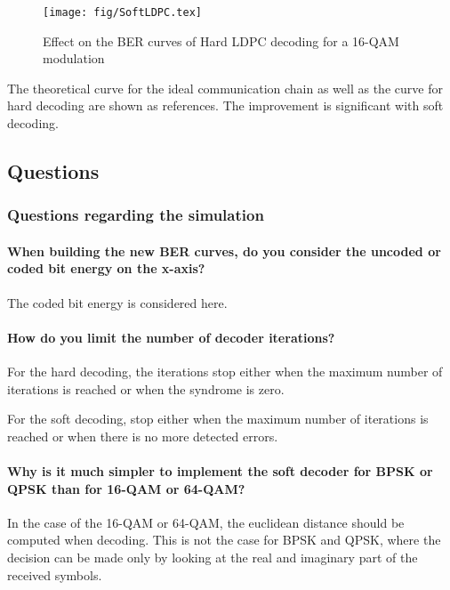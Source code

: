 \begin{figure}[H]
\centering
    \texttt{[image: fig/SoftLDPC.tex]}
     \caption{Effect on the BER curves of Hard LDPC decoding for a 16-QAM modulation}
    \label{fig:SoftLDPC}
\end{figure}

The theoretical curve for the ideal communication chain as well as the curve for hard decoding are shown as references. The improvement is significant with soft decoding.

\subsection{Questions}

\subsubsection{Questions regarding the simulation}

\paragraph{When building the new BER curves, do you consider the uncoded or coded bit energy on	the x-axis?} \mbox{}

The coded bit energy is considered here.

\paragraph{How do you limit the number of decoder iterations?} \mbox{}

For the hard decoding, the iterations stop either when the maximum number of iterations is reached or when the syndrome is zero.

For the soft decoding,  stop either when the maximum number of iterations is reached or when there is no more detected errors.

\paragraph{Why is it much simpler to implement the soft decoder for BPSK or QPSK than for 16-QAM or 64-QAM?} \mbox{}

In the case of the 16-QAM or 64-QAM, the euclidean distance should be computed when decoding. This is not the case for BPSK and QPSK, where the decision can be made only by looking at the real and imaginary part of the received symbols.

